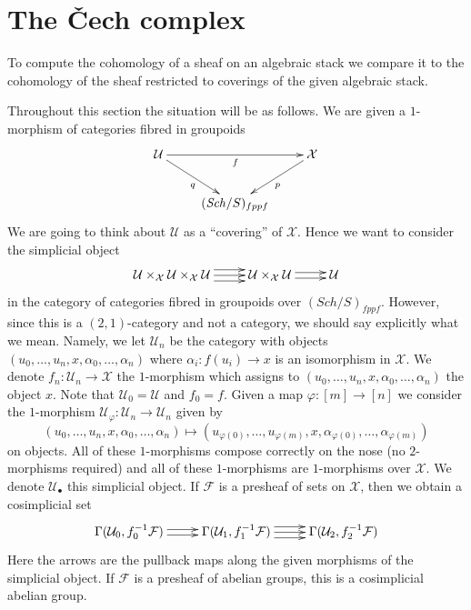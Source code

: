 \documentclass{stacks-project}
\theoremstyle{plain}
\theoremstyle{definition}
\theoremstyle{remark}
\numberwithin{equation}{subsection}
\def\Sch{\mathit{Sch}}
\begin{document}
\section{The {\v C}ech complex}
\label{section-cech}

\noindent
To compute the cohomology of a sheaf on an algebraic stack we compare
it to the cohomology of the sheaf restricted to coverings of the
given algebraic stack.

\medskip\noindent
Throughout this section the situation will be as follows. We are given
a $1$-morphism of categories fibred in groupoids
\begin{equation}
\label{equation-covering}
\vcenter{
\xymatrix{
\mathcal{U} \ar[rr]_f \ar[rd]_q & &  \mathcal{X} \ar[ld]^p \\
& (\Sch/S)_{fppf}
}
}
\end{equation}
We are going to think about $\mathcal{U}$ as a ``covering'' of $\mathcal{X}$.
Hence we want to consider the simplicial object
$$
\xymatrix{
\mathcal{U} \times_\mathcal{X} \mathcal{U} \times_\mathcal{X} \mathcal{U}
\ar@<1ex>[r]
\ar@<0ex>[r]
\ar@<-1ex>[r]
&
\mathcal{U} \times_\mathcal{X} \mathcal{U}
\ar@<0.5ex>[r]
\ar@<-0.5ex>[r]
&
\mathcal{U}
}
$$
in the category of categories fibred in groupoids over
$(\Sch/S)_{fppf}$. However, since this is a $(2, 1)$-category and
not a category, we should say explicitly what we mean. Namely, we let
$\mathcal{U}_n$ be the category with objects
$(u_0, \ldots, u_n, x, \alpha_0, \ldots, \alpha_n)$
where $\alpha_i : f(u_i) \to x$ is an isomorphism in $\mathcal{X}$.
We denote $f_n : \mathcal{U}_n \to \mathcal{X}$ the $1$-morphism
which assigns to $(u_0, \ldots, u_n, x, \alpha_0, \ldots, \alpha_n)$
the object $x$. Note that $\mathcal{U}_0 = \mathcal{U}$ and $f_0 = f$.
Given a map $\varphi : [m] \to [n]$ we consider the $1$-morphism
$\mathcal{U}_\varphi : \mathcal{U}_n \longrightarrow \mathcal{U}_n$
given by
$$
(u_0, \ldots, u_n, x, \alpha_0, \ldots, \alpha_n)
\longmapsto
(u_{\varphi(0)}, \ldots, u_{\varphi(m)}, x,
\alpha_{\varphi(0)}, \ldots, \alpha_{\varphi(m)})
$$
on objects. All of these $1$-morphisms compose correctly on the nose
(no $2$-morphisms required) and all of these $1$-morphisms are $1$-morphisms
over $\mathcal{X}$. We denote $\mathcal{U}_\bullet$ this simplicial object.
If $\mathcal{F}$ is a presheaf of sets on $\mathcal{X}$, then we obtain a
cosimplicial set
$$
\xymatrix{
\Gamma(\mathcal{U}_0, f_0^{-1}\mathcal{F})
\ar@<0.5ex>[r]
\ar@<-0.5ex>[r]
&
\Gamma(\mathcal{U}_1, f_1^{-1}\mathcal{F})
\ar@<1ex>[r]
\ar@<0ex>[r]
\ar@<-1ex>[r]
&
\Gamma(\mathcal{U}_2, f_2^{-1}\mathcal{F})
}
$$
Here the arrows are the pullback maps along the given morphisms of
the simplicial object.
If $\mathcal{F}$ is a presheaf of abelian groups, this is a cosimplicial
abelian group.
\end{document}
